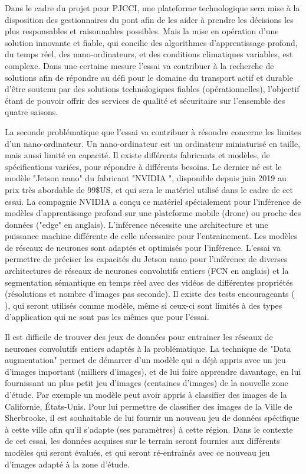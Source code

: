 ﻿\par Dans le cadre du projet pour PJCCI, une plateforme technologique sera mise à la disposition des gestionnaires du pont afin de les aider à prendre les décisions les plus responsables et raisonnables possibles. Mais la mise en opération d'une solution innovante et fiable, qui concilie des algorithmes d'apprentissage profond, du temps réel, des nano-ordinateurs, et des conditions climatiques variables, est complexe. Dans une certaine mesure l'essai va contribuer à la recherche de solutions afin de répondre au défi pour le domaine du transport actif et durable d'être soutenu par des solutions technologiques fiables (opérationnelles), l'objectif étant de pouvoir offrir des services de qualité et sécuritaire sur l'ensemble des quatre saisons.
\par La seconde problématique que l'essai va contribuer à résoudre concerne les limites d'un nano-ordinateur. Un nano-ordinateur est un ordinateur miniaturisé en taille, mais aussi limité en capacité. Il existe différents fabricants et modèles, de spécifications variées, pour répondre à différents besoins. Le dernier né est le modèle "Jetson nano" du fabricant "NVIDIA ", disponible depuis juin 2019 au prix très abordable de 99\$US, et qui sera le matériel utilisé dans le cadre de cet essai. La compagnie NVIDIA a conçu ce matériel spécialement pour l'inférence de modèles d'apprentissage profond sur une plateforme mobile (drone) ou proche des données ("edge" en anglais). L'inférence nécessite une architecture et une puissance machine différente de celle nécessaire pour l'entrainement. Les modèles de réseaux de neurones sont adaptés et optimisés pour l'inférence. L'essai va permettre de préciser les capacités du Jetson nano pour l'inférence de diverses architectures de réseaux de neurones convolutifs entiers (FCN en anglais) et la segmentation sémantique en temps réel avec des vidéos de différentes propriétés (résolutions et nombre d'images pas seconde). Il existe des tests encourageants (\cite{nvidia_jetson_2019-1} \cite{nguyen_mavnet_2019} \cite{chong_real-time_1992}), qui seront utilisés comme modèle, même si ceux-ci sont limités à des types d'application qui ne sont pas les mêmes que pour l'essai.
\par Il est difficile de trouver des jeux de données pour entrainer les réseaux de neurones convolutifs entiers adaptés à la problématique. La technique de "Data augmentation" permet de démarrer d'un modèle qui a déjà appris avec un jeu d'images important (milliers d'images), et de lui faire apprendre davantage, en lui fournissant un plus petit jeu d'images (centaines d'images) de la nouvelle zone d'étude. Par exemple un modèle peut avoir appris à classifier des images de la Californie, États-Unis. Pour lui permettre de classifier des images de la Ville de Sherbrooke, il est souhaitable de lui fournir un nouveau jeu de données spécifique à cette ville afin qu'il s'adapte (ses paramètres) à cette région. Dans le contexte de cet essai, les données acquises sur le terrain seront fournies aux différents modèles qui seront évalués, et qui seront ré-entrainés avec ce nouveau jeu d'images adapté à la zone d'étude.
